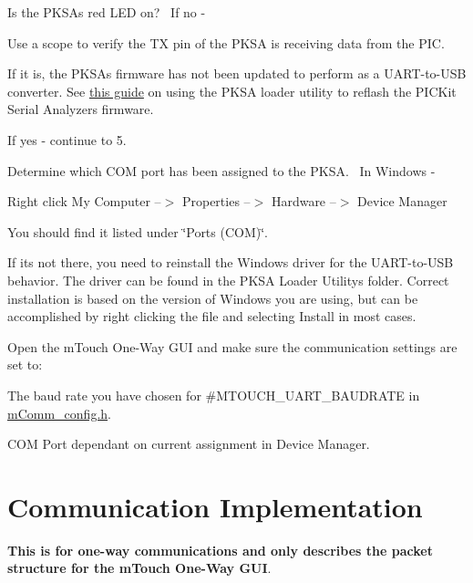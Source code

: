 \begin{DoxyEnumerate}
\item Is the P\+K\+S\+A\textquotesingle{}s red L\+E\+D on?~\newline
 If no -\/ 
\begin{DoxyItemize}
\item Use a scope to verify the T\+X pin of the P\+K\+S\+A is receiving data from the P\+I\+C. 
\item If it is, the P\+K\+S\+A\textquotesingle{}s firmware has not been updated to perform as a U\+A\+R\+T-\/to-\/\+U\+S\+B converter. See \hyperlink{PKSARS232}{this guide} on using the P\+K\+S\+A loader utility to reflash the P\+I\+C\+Kit Serial Analyzer\textquotesingle{}s firmware. 
\end{DoxyItemize}If yes -\/ continue to 5.


\item Determine which C\+O\+M port has been assigned to the P\+K\+S\+A.~\newline
 In Windows -\/ 
\begin{DoxyItemize}
\item Right click \textquotesingle{}My Computer\textquotesingle{} --$>$ Properties --$>$ Hardware --$>$ Device Manager 
\item You should find it listed under \char`\"{}\+Ports (\+C\+O\+M)\char`\"{}. 
\end{DoxyItemize}If it\textquotesingle{}s not there, you need to reinstall the Windows driver for the U\+A\+R\+T-\/to-\/\+U\+S\+B behavior. The driver can be found in the P\+K\+S\+A Loader Utility\textquotesingle{}s folder. Correct installation is based on the version of Windows you are using, but can be accomplished by right clicking the file and selecting \textquotesingle{}Install\textquotesingle{} in most cases.


\item Open the m\+Touch One-\/\+Way G\+U\+I and make sure the communication settings are set to\+:~\newline
~\newline
 
\begin{DoxyItemize}
\item The baud rate you have chosen for \#\+M\+T\+O\+U\+C\+H\+\_\+\+U\+A\+R\+T\+\_\+\+B\+A\+U\+D\+R\+A\+T\+E in \hyperlink{m_comm__config_8h}{m\+Comm\+\_\+config.\+h}. 
\item C\+O\+M Port dependant on current assignment in Device Manager. 
\end{DoxyItemize}
\end{DoxyEnumerate}\hypertarget{digCom}{}\section{Communication Implementation}\label{digCom}
{\bfseries This is for one-\/way communications and only describes the packet structure for the m\+Touch One-\/\+Way G\+U\+I}.


